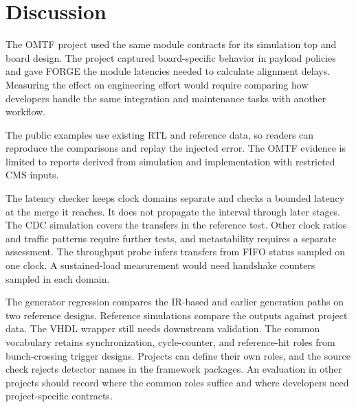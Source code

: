\section{Discussion}
\label{sec:forge:conclusions}
\label{sec:forge:limitations}

The OMTF project used the same module contracts for its simulation top and board design. The project captured board-specific behavior in payload policies and gave FORGE the module latencies needed to calculate alignment delays. Measuring the effect on engineering effort would require comparing how developers handle the same integration and maintenance tasks with another workflow.

The public examples use existing RTL and reference data, so readers can reproduce the comparisons and replay the injected error. The OMTF evidence is limited to reports derived from simulation and implementation with restricted CMS inputs.

The latency checker keeps clock domains separate and checks a bounded latency at the merge it reaches. It does not propagate the interval through later stages. The CDC simulation covers the transfers in the reference test. Other clock ratios and traffic patterns require further tests, and metastability requires a separate assessment. The throughput probe infers transfers from FIFO status sampled on one clock. A sustained-load measurement would need handshake counters sampled in each domain.

The generator regression compares the IR-based and earlier generation paths on two reference designs. Reference simulations compare the outputs against project data. The VHDL wrapper still needs downstream validation. The common vocabulary retains synchronization, cycle-counter, and reference-hit roles from bunch-crossing trigger designs. Projects can define their own roles, and the source check rejects detector names in the framework packages. An evaluation in other projects should record where the common roles suffice and where developers need project-specific contracts.
